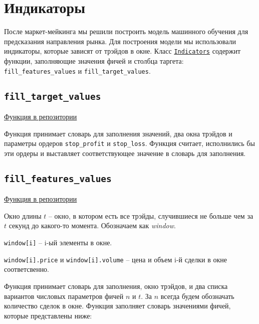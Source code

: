 \section{Индикаторы}

После маркет-мейкинга мы решили построить модель машинного обучения для предсказания направления рынка. Для построения модели мы использовали индикаторы, которые зависят от трэйдов в окне. Класс \href{https://github.com/dexety/dex-trading-system/blob/ca0370d602f2dfa05262b9b8574002f965ac1502/utils/indicators.py#L5}{\texttt{Indicators}} содержит функции, заполняющие значения фичей и столбца таргета: \texttt{fill\_features\_values} и \texttt{fill\_target\_values}.

\subsection{\texttt{fill\_target\_values}}
\href{https://github.com/dexety/dex-trading-system/blob/ca0370d602f2dfa05262b9b8574002f965ac1502/utils/indicators.py#L15}{Функция в репозитории}

Функция принимает словарь для заполнения значений, два окна трэйдов и параметры ордеров \texttt{stop\_profit} и \texttt{stop\_loss}. Функция считает, исполнились бы эти ордеры и выставляет соответствующее значение в словарь для заполнения.

\subsection{\texttt{fill\_features\_values}}
\href{https://github.com/dexety/dex-trading-system/blob/ca0370d602f2dfa05262b9b8574002f965ac1502/utils/indicators.py#L48}{Функция в репозитории}

\begin{designation}
Окно длины $t$ -- окно, в котором есть все трэйды, случившиеся не больше чем за $t$ секунд до какого-то момента. Обозначаем как \textit{window}.
\end{designation}

\begin{designation}
    \texttt{window[i]} -- i-ый элементы в окне.
\end{designation}
\begin{designation}
    \texttt{window[i].price} и \texttt{window[i].volume} -- цена и объем i-й сделки в окне соответсвенно.
\end{designation}

Функция принимает словарь для заполнения, окно трэйдов, и два списка вариантов числовых параметров фичей $n$ и $t$. За $n$ всегда будем обозначать количество сделок в окне. Функция заполняет словарь значениями фичей, которые представлены ниже:

